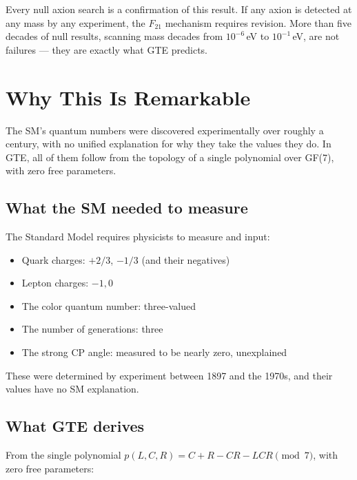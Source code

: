 \documentclass[11pt,a4paper]{article}
\begin{document}
Every null axion search is a confirmation of this result.  If any axion is
detected at any mass by any experiment, the $F_{21}$ mechanism requires
revision.  More than five decades of null results, scanning mass decades
from $10^{-6}$\,eV to $10^{-1}$\,eV, are not failures --- they are exactly
what GTE predicts.

\section{Why This Is Remarkable}
\label{sec:remarkable}

\begin{tcolorbox}[colback=boxyellow,colframe=yellow!60!black,
  title=The bottom line]
The SM's quantum numbers were discovered experimentally over roughly a
century, with no unified explanation for why they take the values they do.
In GTE, all of them follow from the topology of a single polynomial over
GF(7), with zero free parameters.
\end{tcolorbox}

\subsection{What the SM needed to measure}

The Standard Model requires physicists to measure and input:
\begin{itemize}[itemsep=2pt]
  \item Quark charges: $+2/3$, $-1/3$ (and their negatives)
  \item Lepton charges: $-1, 0$
  \item The color quantum number: three-valued
  \item The number of generations: three
  \item The strong CP angle: measured to be nearly zero, unexplained
\end{itemize}
These were determined by experiment between 1897 and the 1970s, and their
values have no SM explanation.

\subsection{What GTE derives}

From the single polynomial $p(L,C,R) = C + R - CR - LCR \pmod 7$, with zero
free parameters:
\end{document}
